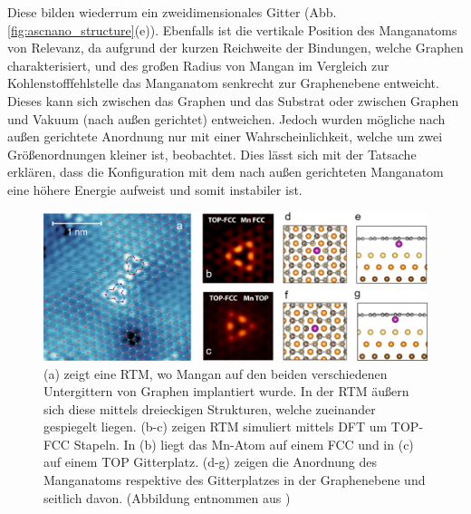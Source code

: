 Diese bilden wiederrum ein zweidimensionales Gitter (Abb. \ref{fig:ascnano_structure}(e)).
Ebenfalls ist die vertikale Position des Manganatoms von Relevanz, da aufgrund der kurzen Reichweite der Bindungen,
welche Graphen charakterisiert, und des großen Radius von Mangan im Vergleich zur Kohlenstofffehlstelle das Manganatom senkrecht zur Graphenebene
entweicht.
Dieses kann sich zwischen das Graphen und das Substrat oder zwischen Graphen und Vakuum (nach außen gerichtet) entweichen. 
Jedoch wurden mögliche nach außen gerichtete Anordnung nur mit einer Wahrscheinlichkeit, 
welche um zwei Größenordnungen kleiner ist, beobachtet.
Dies lässt sich mit der Tatsache erklären, dass die Konfiguration mit dem nach außen gerichteten Manganatom
eine höhere Energie aufweist und somit instabiler ist.
\begin{figure}
    \centering
    \includegraphics[width = \textwidth]{Plots/images_large_nn1c00139_0003.jpeg}
    \caption{(a) zeigt eine RTM, wo Mangan auf den beiden verschiedenen Untergittern von Graphen implantiert wurde. In der
    RTM äußern sich diese mittels dreieckigen Strukturen, welche zueinander gespiegelt liegen.
    (b-c) zeigen RTM simuliert mittels DFT um TOP-FCC Stapeln. In (b) liegt das Mn-Atom auf einem FCC
    und in (c) auf einem TOP Gitterplatz. (d-g) zeigen die Anordnung des Manganatoms respektive des Gitterplatzes
    in der Graphenebene und seitlich davon. 
    (Abbildung entnommen aus \cite{doi:10.1021/acsnano.1c00139})}
    \label{fig:ascnano_defect}
\end{figure}
